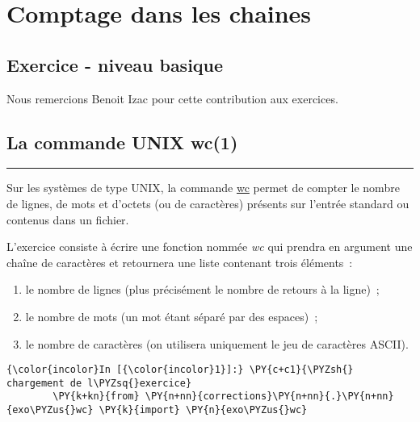     
    
    
    

    

    \hypertarget{comptage-dans-les-chaines}{%
\section{Comptage dans les chaines}\label{comptage-dans-les-chaines}}

    \hypertarget{exercice---niveau-basique}{%
\subsection{Exercice - niveau basique}\label{exercice---niveau-basique}}

    Nous remercions Benoit Izac pour cette contribution aux exercices.

    \hypertarget{la-commande-unix-wc1}{%
\subsection{La commande UNIX wc(1)}\label{la-commande-unix-wc1}}

\begin{center}\rule{0.5\linewidth}{\linethickness}\end{center}

Sur les systèmes de type UNIX, la commande
\href{http://pubs.opengroup.org/onlinepubs/9699919799/utilities/wc.html}{wc}
permet de compter le nombre de lignes, de mots et d'octets (ou de
caractères) présents sur l'entrée standard ou contenus dans un fichier.

L'exercice consiste à écrire une fonction nommée \emph{wc} qui prendra
en argument une chaîne de caractères et retournera une liste contenant
trois éléments~:

\begin{enumerate}
\def\labelenumi{\arabic{enumi}.}
\tightlist
\item
  le nombre de lignes (plus précisément le nombre de retours à la
  ligne)~;
\item
  le nombre de mots (un mot étant séparé par des espaces)~;
\item
  le nombre de caractères (on utilisera uniquement le jeu de caractères
  ASCII).
\end{enumerate}

    \begin{Verbatim}[commandchars=\\\{\}]
{\color{incolor}In [{\color{incolor}1}]:} \PY{c+c1}{\PYZsh{} chargement de l\PYZsq{}exercice}
        \PY{k+kn}{from} \PY{n+nn}{corrections}\PY{n+nn}{.}\PY{n+nn}{exo\PYZus{}wc} \PY{k}{import} \PY{n}{exo\PYZus{}wc}
\end{Verbatim}


